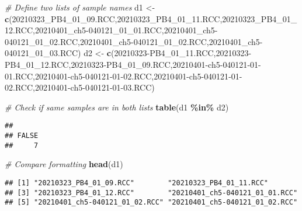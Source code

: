 \documentclass[
]{article}
\newenvironment{Shaded}{\begin{snugshade}}{\end{snugshade}}
\newcommand{\CommentTok}[1]{\textcolor[rgb]{0.56,0.35,0.01}{\textit{#1}}}
\newcommand{\FunctionTok}[1]{\textcolor[rgb]{0.13,0.29,0.53}{\textbf{#1}}}
\newcommand{\NormalTok}[1]{#1}
\newcommand{\OtherTok}[1]{\textcolor[rgb]{0.56,0.35,0.01}{#1}}
\newcommand{\SpecialCharTok}[1]{\textcolor[rgb]{0.81,0.36,0.00}{\textbf{#1}}}
\newcommand{\StringTok}[1]{\textcolor[rgb]{0.31,0.60,0.02}{#1}}
\begin{document}
\begin{Shaded}
\begin{Highlighting}[]
\CommentTok{\# Define two lists of sample names}
\NormalTok{d1 }\OtherTok{\textless{}{-}} \FunctionTok{c}\NormalTok{(}\StringTok{\textquotesingle{}20210323\_PB4\_01\_09.RCC\textquotesingle{}}\NormalTok{,}\StringTok{\textquotesingle{}20210323\_PB4\_01\_11.RCC\textquotesingle{}}\NormalTok{,}\StringTok{\textquotesingle{}20210323\_PB4\_01\_12.RCC\textquotesingle{}}\NormalTok{,}\StringTok{\textquotesingle{}20210401\_ch5{-}040121\_01\_01.RCC\textquotesingle{}}\NormalTok{,}\StringTok{\textquotesingle{}20210401\_ch5{-}040121\_01\_02.RCC\textquotesingle{}}\NormalTok{,}\StringTok{\textquotesingle{}20210401\_ch5{-}040121\_01\_02.RCC\textquotesingle{}}\NormalTok{,}\StringTok{\textquotesingle{}20210401\_ch5{-}040121\_01\_03.RCC\textquotesingle{}}\NormalTok{)}
\NormalTok{d2 }\OtherTok{\textless{}{-}} \FunctionTok{c}\NormalTok{(}\StringTok{\textquotesingle{}20210323{-}PB4\_01\_11.RCC\textquotesingle{}}\NormalTok{,}\StringTok{\textquotesingle{}20210323{-}PB4\_01\_12.RCC\textquotesingle{}}\NormalTok{,}\StringTok{\textquotesingle{}20210323{-}PB4\_01\_09.RCC\textquotesingle{}}\NormalTok{,}\StringTok{\textquotesingle{}20210401{-}ch5{-}040121{-}01{-}01.RCC\textquotesingle{}}\NormalTok{,}\StringTok{\textquotesingle{}20210401{-}ch5{-}040121{-}01{-}02.RCC\textquotesingle{}}\NormalTok{,}\StringTok{\textquotesingle{}20210401{-}ch5{-}040121{-}01{-}02.RCC\textquotesingle{}}\NormalTok{,}\StringTok{\textquotesingle{}20210401{-}ch5{-}040121{-}01{-}03.RCC\textquotesingle{}}\NormalTok{)}

\CommentTok{\# Check if same samples are in both lists}
\FunctionTok{table}\NormalTok{(d1 }\SpecialCharTok{\%in\%}\NormalTok{ d2)}
\end{Highlighting}
\end{Shaded}

\begin{verbatim}
## 
## FALSE 
##     7
\end{verbatim}

\begin{Shaded}
\begin{Highlighting}[]
\CommentTok{\# Compare formatting }
\FunctionTok{head}\NormalTok{(d1)}
\end{Highlighting}
\end{Shaded}

\begin{verbatim}
## [1] "20210323_PB4_01_09.RCC"        "20210323_PB4_01_11.RCC"       
## [3] "20210323_PB4_01_12.RCC"        "20210401_ch5-040121_01_01.RCC"
## [5] "20210401_ch5-040121_01_02.RCC" "20210401_ch5-040121_01_02.RCC"
\end{verbatim}
\end{document}
